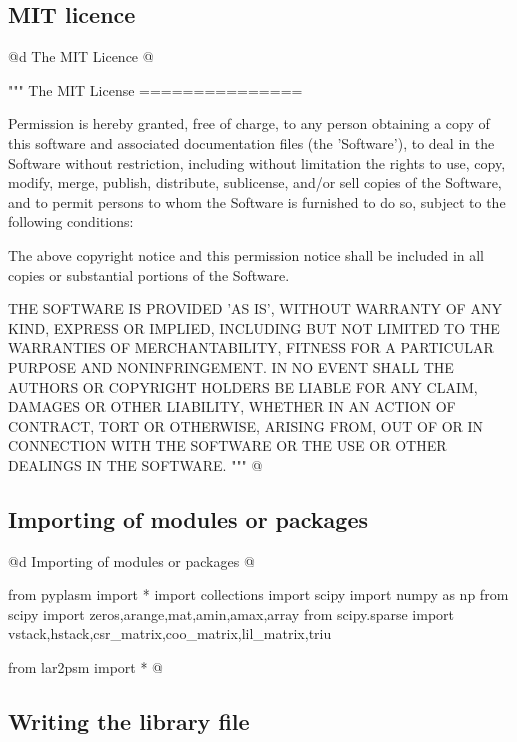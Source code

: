 \documentclass[11pt,oneside]{article}	%
\begin{document}
\subsection{MIT licence}
@d The MIT Licence
@{
"""
The MIT License
===============
    
Permission is hereby granted, free of charge, to any person obtaining
a copy of this software and associated documentation files (the
'Software'), to deal in the Software without restriction, including
without limitation the rights to use, copy, modify, merge, publish,
distribute, sublicense, and/or sell copies of the Software, and to
permit persons to whom the Software is furnished to do so, subject to
the following conditions:

The above copyright notice and this permission notice shall be
included in all copies or substantial portions of the Software.

THE SOFTWARE IS PROVIDED 'AS IS', WITHOUT WARRANTY OF ANY KIND,
EXPRESS OR IMPLIED, INCLUDING BUT NOT LIMITED TO THE WARRANTIES OF
MERCHANTABILITY, FITNESS FOR A PARTICULAR PURPOSE AND NONINFRINGEMENT.
IN NO EVENT SHALL THE AUTHORS OR COPYRIGHT HOLDERS BE LIABLE FOR ANY
CLAIM, DAMAGES OR OTHER LIABILITY, WHETHER IN AN ACTION OF CONTRACT,
TORT OR OTHERWISE, ARISING FROM, OUT OF OR IN CONNECTION WITH THE
SOFTWARE OR THE USE OR OTHER DEALINGS IN THE SOFTWARE.
"""
@}
\subsection{Importing of modules or packages}
@d Importing of modules or packages
@{from pyplasm import *
import collections
import scipy
import numpy as np
from scipy import zeros,arange,mat,amin,amax,array
from scipy.sparse import vstack,hstack,csr_matrix,coo_matrix,lil_matrix,triu

from lar2psm import *
@}

\subsection{Writing the library file}
\end{document}
